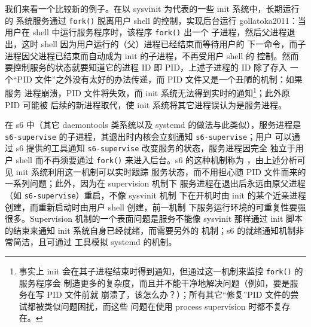 我们来看一个比较新的例子。在以 sysvinit 为代表的一些 init 系统中，长期运行的
系统服务通过 \verb|fork()| 脱离用户 shell 的控制，实现后台运行\cupercite%
{gollatoka2011}：当用户在 shell 中运行服务程序时，该程序 \verb|fork()| 出一个
子进程，然后父进程退出，这时 shell 因为用户运行的（父）进程已经结束而等待用户的
下一命令，而子进程因父进程已结束而自动成为 init 的子进程，不再受用户 shell 的
控制。然而要控制服务的状态就要知道它的进程 ID 即 PID，上述子进程的 ID 除了存入
一个“PID 文件”之外没有太好的办法传递，而 PID 文件又是一个丑陋的机制：如果服务
进程崩溃，PID 文件将失效，而 init 系统无法得到实时的通知\footnote{事实上 init
会在其子进程结束时得到通知，但通过这一机制来监控 \texttt{fork()} 的服务程序会
制造更多的复杂度，而且并不能干净地解决问题（例如，要是服务在写 PID 文件前就
崩溃了，该怎么办？）；所有其它“修复”PID 文件的尝试都被类似问题困扰，而这些
问题在使用 process supervision 时都不复存在。}；此外原 PID 可能被
后续的新进程取代，使 init 系统将其它进程误认为是服务进程。

在 s6 中（其它 daemontools 类系统以及 systemd 的做法与此类似），服务进程是
\verb|s6-supervise| 的子进程，其退出时内核会立刻通知 \verb|s6-supervise|；用户
可以通过 s6 提供的工具通知 \verb|s6-supervise| 改变服务的状态，服务进程因完全
独立于用户 shell 而不再须要通过 \verb|fork()| 来进入后台。s6 的这种机制称为%
，由上述分析可见 init 系统利用这一机制可以实时跟踪
服务状态，而不用担心随 PID 文件而来的一系列问题；此外，因为在 supervision 机制下
服务进程在退出后永远由原父进程（如 \verb|s6-supervise|）重启，不像 sysvinit 机制
下在开机时由 init 的某个近亲进程创建，而重新启动时由用户 shell 创建，前一机制
下服务运行环境的可重复性要强很多。Supervision 机制的一个表面问题是服务不能像
sysvinit 那样通过 init 脚本的结束来通知 init 系统自身已经就绪，而需要另外的
机制；s6 的就绪通知机制非常简洁，且可通过
工具模拟 systemd 的机制。

